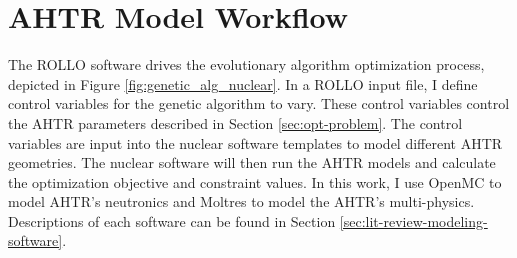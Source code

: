 \section{AHTR Model Workflow}
The \gls{ROLLO} software drives the evolutionary algorithm optimization process, 
depicted in Figure \ref{fig:genetic_alg_nuclear}. 
In a \gls{ROLLO} input file, I define control variables for the genetic algorithm 
to vary. 
These control variables control the \gls{AHTR} parameters described in 
Section \ref{sec:opt-problem}.
The control variables are input into the nuclear software templates to model different 
AHTR geometries.
The nuclear software will then run the \gls{AHTR} models and calculate the optimization 
objective and constraint values. 
In this work, I use OpenMC \cite{romano_openmc:_2015} to model \gls{AHTR}'s neutronics 
and Moltres \cite{lindsay_introduction_2018} to model the \gls{AHTR}'s multi-physics. 
Descriptions of each software can be found in Section 
\ref{sec:lit-review-modeling-software}.

